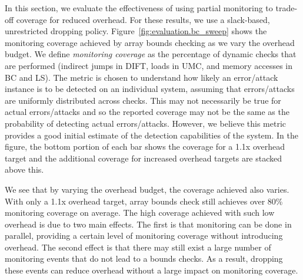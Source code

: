 In this section, we evaluate the effectiveness of
using partial monitoring to trade-off coverage for reduced overhead.
For these results, we use a slack-based, unrestricted dropping policy.
Figure~\ref{fig:evaluation.bc_sweep} shows the monitoring coverage achieved by
array bounds checking as we vary the overhead budget. 
We define \emph{monitoring coverage} as the 
percentage of dynamic checks that are performed 
(indirect jumps in DIFT, loads in UMC, and memory accesses in BC and LS). 
The metric is chosen to understand
how likely an error/attack instance is to be detected on an individual system, 
assuming that errors/attacks are uniformly distributed across checks. This may
not necessarily be true for actual errors/attacks and so the reported coverage
may not be the same as the probability of detecting actual errors/attacks.
However, we believe this metric
provides a good initial estimate of the detection capabilities of the system.
In the figure, the bottom portion of each
bar shows the coverage for a 1.1x overhead target and the additional
coverage for increased overhead targets are stacked above this.

We see that by varying the overhead budget, the coverage achieved also varies.
With only a 1.1x overhead target, array bounds check still
achieves over 80\% monitoring coverage on average. The high coverage
achieved with such low overhead is due to two main effects.  The first is that
monitoring can be done in parallel, providing a certain level of monitoring coverage without
introducing overhead. The second effect is that there may still exist a large number of
monitoring events that do not lead to a bounds checks. As a
result, dropping these events can reduce overhead without a large impact on
monitoring coverage.

